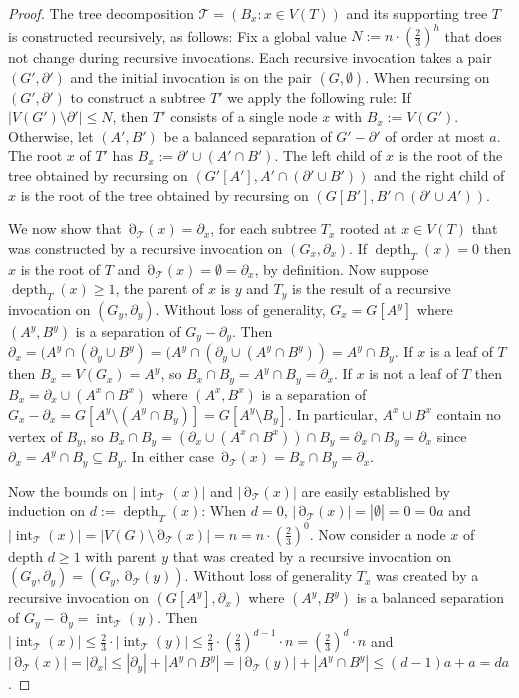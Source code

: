 \documentclass{patmorin}
\DeclareMathOperator{\depth}{depth}
\DeclareMathOperator{\interior}{int}
\DeclareMathOperator{\boundary}{\partial}
\begin{document}
\begin{proof}
  The tree decomposition $\mathcal{T}=(B_x:x\in V(T))$ and its supporting tree $T$ is constructed recursively, as follows:  Fix a global value $N:=n\cdot(\tfrac{2}{3})^h$ that does not change during recursive invocations. Each recursive invocation takes a pair $(G',\partial')$ and the initial invocation is on the pair $(G,\emptyset)$. When recursing on $(G',\partial')$ to construct a subtree $T'$ we apply the following rule:  If $|V(G')\setminus\partial'|\le N$, then $T'$ consists of a single node $x$ with $B_{x}:=V(G')$.  Otherwise, let $(A',B')$ be a balanced separation of $G'-\partial'$ of order at most $a$.  The root $x$ of $T'$ has $B_{x}:=\partial'\cup (A'\cap B')$. The left child of $x$ is the root of the tree obtained by recursing on $(G'[A'],A'\cap(\partial'\cup B'))$ and the right child of $x$ is the root of the tree obtained by recursing on $(G[B'],B'\cap(\partial'\cup A'))$.

  We now show that $\boundary_{\mathcal{T}}(x)=\partial_x$, for each subtree $T_x$ rooted at $x\in V(T)$ that was constructed by a recursive invocation on $(G_x,\partial_x)$. If $\depth_T(x)=0$ then $x$ is the root of $T$ and $\boundary_{\mathcal{T}}(x)=\emptyset=\partial_x$, by definition.  
  Now suppose $\depth_T(x)\ge 1$, the parent of $x$ is $y$ and $T_y$ is the result of a recursive invocation on $(G_y,\partial_y)$.
  Without loss of generality, $G_x=G[A^y]$ where $(A^y,B^y)$ is a separation of $G_y-\partial_y$.  Then $\partial_x=(A^y\cap(\partial_y\cup B^y)=(A^y\cap (\partial_y\cup (A^y\cap B^y))=A^y\cap B_y$.  If $x$ is a leaf of $T$ then $B_x=V(G_x)=A^y$, so $B_x\cap B_y=A^y\cap B_y=\partial_x$.  If $x$ is not a leaf of $T$ then $B_x=\partial_x\cup (A^x\cap B^x)$ where $(A^x,B^x)$ is a separation of $G_x-\partial_x=G[A^y\setminus (A^y\cap B_y)]=G[A^y\setminus B_y]$. In particular, $A^x\cup B^x$ contain no vertex of $B_y$, so $B_x\cap B_y=(\partial_x\cup (A^x\cap B^x))\cap B_y= \partial_x\cap B_y=\partial_x$ since $\partial_x=A^y\cap B_y\subseteq B_y$.  In either case $\boundary_{\mathcal{T}}(x)=B_x\cap B_y=\partial_x$.
  
  
  Now the bounds on $|\interior_{\mathcal{T}}(x)|$ and $|\boundary_{\mathcal{T}}(x)|$ are easily established by induction on $d:=\depth_T(x)$: When $d=0$, $|\boundary_{\mathcal{T}}(x)|=|\emptyset|=0 = 0a$ and $|\interior_{\mathcal{T}}(x)|=|V(G)\setminus\boundary_{\mathcal{T}}(x)|=n=n\cdot (\tfrac{2}{3})^0$. Now consider a node $x$ of depth $d\ge 1$ with parent $y$ that was created by a recursive invocation on $(G_y,\partial_y)=(G_y,\boundary_\mathcal{T}(y))$. Without loss of generality $T_x$ was created by a recursive invocation on $(G[A^y],\partial_x)$ where $(A^y,B^y)$ is a balanced separation of $G_y-\boundary_y=\interior_{\mathcal{T}}(y)$. Then  $|\interior_{\mathcal{T}}(x)|\le \tfrac{2}{3}\cdot |\interior_{\mathcal{T}}(y)|\le \tfrac{2}{3}\cdot (\frac{2}{3})^{d-1}\cdot n=(\tfrac{2}{3})^d\cdot n$ and $|\boundary_{\mathcal{T}}(x)|=|\partial_x|\le |\partial_y|+|A^y\cap B^y|= |\boundary_{\mathcal{T}}(y)|+|A^y\cap B^y|\le (d-1)a + a=da$.
  

\end{proof}
\end{document}

